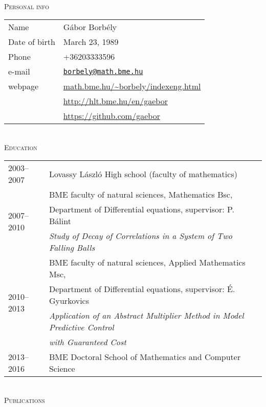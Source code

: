 \documentclass[12pt]{article}
\newcommand\mail[1]{\href{mailto:#1}{\texttt{#1}}}
\begin{document}
{ \ }
\\
\textsc{Personal info}
 \vspace{0.3cm}
 \\
       \begin{tabular}{p{3.5cm}l}
	       Name & Gábor Borbély\\
           Date of birth & March 23, 1989\\
		   Phone &  +36203333596\\
		   e-mail & \mail{borbely@math.bme.hu}\\
		   webpage& \url{math.bme.hu/~borbely/indexeng.html} \\
                  & \url{http://hlt.bme.hu/en/gaebor} \\
                  & \url{https://github.com/gaebor}
       \end{tabular}
 \vspace{0.3cm}
 \\
 \textsc{Education}
 \vspace{0.3cm}
 \\
       \begin{tabular}{p{3.5cm}l}
	       2003--2007 & Lovassy László High school (faculty of mathematics) \\
           \multirow{3}{*}[15pt]{2007--2010}& BME faculty of natural sciences, Mathematics Bsc, \\
		              & Department of Differential equations, supervisor: P. Bálint\\
					  & \emph{Study of Decay of Correlations in a System of Two Falling Balls} \\
		   \multirow{4}{*}[22pt]{2010--2013} & BME faculty of natural sciences, Applied Mathematics Msc,\\
						& Department of Differential equations, supervisor: É. Gyurkovics\\
						& \emph{Application of an Abstract Multiplier Method in Model Predictive Control}\\ & \emph{ with Guaranteed Cost} \\
		    \multirow{3}{*}[15pt]{2013--2016} & BME Doctoral School of Mathematics and Computer Science
       \end{tabular}
 \vspace{0.3cm}
 \\
 \textsc{Publications}
 \vspace{0.3cm}
 \\
\end{document}
